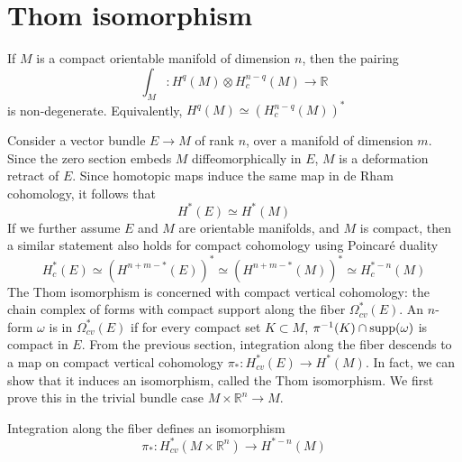 \section{Thom isomorphism}
\begin{thm} 
	\label{thm:poincare_duality}
	If $M$ is a compact orientable manifold of dimension $n$, then the pairing 
	\[
	\int_M : H^q(M)\otimes H_c^{n-q}(M) \to \mathbb{R}
	\] 
	is non-degenerate. Equivalently, $H^q(M)\simeq (H^{n-q}_c(M))^*$
\end{thm}
Consider a vector bundle $E\to M$ of rank  $n$, over a manifold of dimension $m$. 
Since the zero section embeds
$M$ diffeomorphically in  $E$, $M$ is a deformation retract of  $E$. Since
homotopic maps induce the same map in de Rham cohomology, it follows that
\[
H^*(E) \simeq H^*(M)
\] 
If we further assume $E$ and  $M$ are orientable manifolds, and $M$ is
compact, then a similar statement also holds for compact cohomology using 
Poincar\'e duality %
\[
H^*_c(E) \simeq (H^{n+m-*}(E))^* \simeq (H^{n+m-*}(M))^* \simeq H^{*-n}_c(M)
\] 
The Thom isomorphism is concerned with compact vertical cohomology: the chain
complex of forms with compact support along the fiber $\Omega_{cv}^*(E)$. An
$n$-form  $\omega$ is in $\Omega_{cv}^*(E)$ if for every compact set $K \subset M$, 
$\pi^{-1}(K)\cap \operatorname{supp}(\omega)$ is compact in $E$. 
From the previous section, integration along the fiber descends to a map 
on compact vertical cohomology
$\pi_* : H_{cv}^*(E) \to H^*(M)$. In fact, we can show that it induces an
isomorphism, called the Thom isomorphism.
We first prove this in the trivial bundle case $M\times \mathbb{R}^n \to M$.
\begin{prop} %
	Integration along the fiber defines an isomorphism
	\[
	\pi_* : H_{cv}^*(M\times \mathbb{R}^n) \to H^{*-n}(M)
	\] 
\end{prop}
